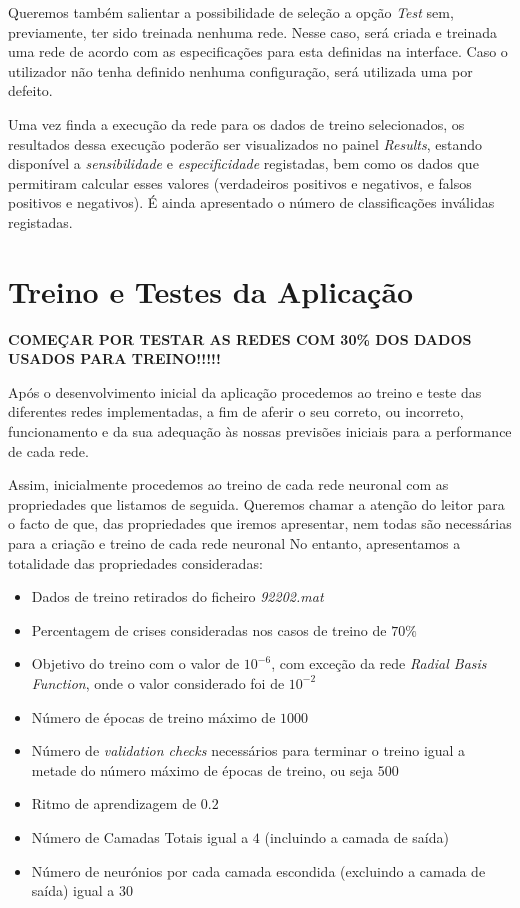 \documentclass{article}
\begin{document}
Queremos também salientar a possibilidade de seleção a opção \emph{Test} sem, previamente, ter sido treinada nenhuma rede. Nesse caso, será criada e treinada uma rede de acordo com as especificações para esta definidas na interface. Caso o utilizador não tenha definido nenhuma configuração, será utilizada uma por defeito.

Uma vez finda a execução da rede para os dados de treino selecionados, os resultados dessa execução poderão ser visualizados no painel \emph{Results}, estando disponível a \emph{sensibilidade} e \emph{especificidade} registadas, bem como os dados que permitiram calcular esses valores (verdadeiros positivos e negativos, e falsos positivos e negativos). É ainda apresentado o número de classificações inválidas registadas. 

\pagebreak

\section{Treino e Testes da Aplicação}
\label{sec:train_tests}

\textbf{COMEÇAR POR TESTAR AS REDES COM 30\% DOS DADOS USADOS PARA TREINO!!!!!}

Após o desenvolvimento inicial da aplicação procedemos ao treino e teste das diferentes redes implementadas, a fim de aferir o seu correto, ou incorreto, funcionamento e da sua adequação às nossas previsões iniciais para a performance de cada rede.

Assim, inicialmente procedemos ao treino de cada rede neuronal com as propriedades que listamos de seguida. Queremos chamar a atenção do leitor para o facto de que, das propriedades que iremos apresentar, nem todas são necessárias para a criação e treino de cada rede neuronal No entanto, apresentamos a totalidade das propriedades consideradas:

\begin{itemize}
\item Dados de treino retirados do ficheiro \emph{92202.mat}

\item Percentagem de crises consideradas nos casos de treino de $70\%$

\item Objetivo do treino com o valor de $10^{-6}$, com exceção da rede \emph{Radial Basis Function}, onde o valor considerado foi de $10^{-2}$

\item Número de épocas de treino máximo de $1000$

\item Número de \emph{validation checks} necessários para terminar o treino igual a metade do número máximo de épocas de treino, ou seja $500$

\item Ritmo de aprendizagem de $0.2$

\item Número de Camadas Totais igual a $4$ (incluindo a camada de saída)

\item Número de neurónios por cada camada escondida (excluindo a camada de saída) igual a $30$
\end{itemize}
\end{document}

